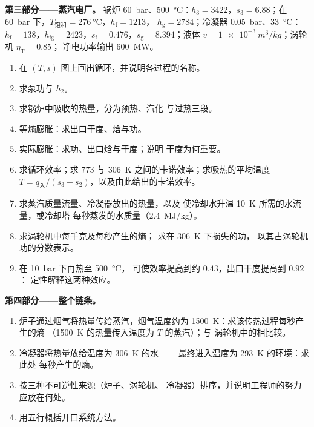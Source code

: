 \begin{problem}
\textbf{第三部分——蒸汽电厂。}
锅炉 \qty{60}{bar}、\qty{500}{\celsius}：$h_3 = 3422$，$s_3 = 6.88$；在
\qty{60}{bar} 下，$T_{\text{饱和}} = \qty{276}{\celsius}$，$h_{\text{f}} = 1213$，
$h_{\text{g}} = 2784$；冷凝器 \qty{0.05}{bar}、\qty{33}{\celsius}：
$h_{\text{f}} = 138$，$h_{\text{fg}} = 2423$，$s_{\text{f}} = 0.476$，$s_{\text{g}} =
8.394$；液体 $v = \qty{1e-3}{m^3/kg}$；涡轮机 $\eta_{\text{T}} = 0.85$；
净电功率输出 \qty{600}{MW}。
\begin{enumerate}[resume]
  \item 在 $(T,s)$ 图上画出循环，并说明各过程的名称。
  \item 求泵功与 $h_2$。
  \item 求锅炉中吸收的热量，分为预热、汽化
        与过热三段。
  \item 等熵膨胀：求出口干度、焓与功。
  \item 实际膨胀：求功、出口焓与干度；说明
        干度为何重要。
  \item 求循环效率；求 \qty{773}{} 与 \qty{306}{K}
        之间的卡诺效率；求吸热的平均温度 $\bar T = q_{\text{入}}/(s_3
        - s_2)$，以及由此给出的卡诺效率。
  \item 求蒸汽质量流量、冷凝器放出的热量，以及
        使冷却水升温 \qty{10}{K} 所需的水流量，或冷却塔
        每秒蒸发的水质量（\qty{2.4}{MJ/kg}）。
  \item 求涡轮机中每千克及每秒产生的熵；
        求在 \qty{306}{K} 下损失的功，
        以其占涡轮机功的分数表示。
  \item 在 \qty{10}{bar} 下再热至 \qty{500}{\celsius}，
        可使效率提高到约 $0.43$，出口干度提高到 $0.92$：
        定性解释这两种效应。
\end{enumerate}

\textbf{第四部分——整个链条。}
\begin{enumerate}[resume]
  \item 炉子通过烟气将热量传给蒸汽，烟气温度约为
        \qty{1500}{K}：求该传热过程每秒产生的熵
        （\qty{1500}{K} 的热量传入温度为 $\bar T$ 的蒸汽）；与
        涡轮机中的相比较。
  \item 冷凝器将热量放给温度为 \qty{306}{K} 的水——
        最终进入温度为 \qty{293}{K} 的环境：求此处
        每秒产生的熵。
  \item 按三种不可逆性来源（炉子、涡轮机、
        冷凝器）排序，并说明工程师的努力应放在何处。
  \item 用五行概括开口系统方法。
\end{enumerate}
\end{problem}
